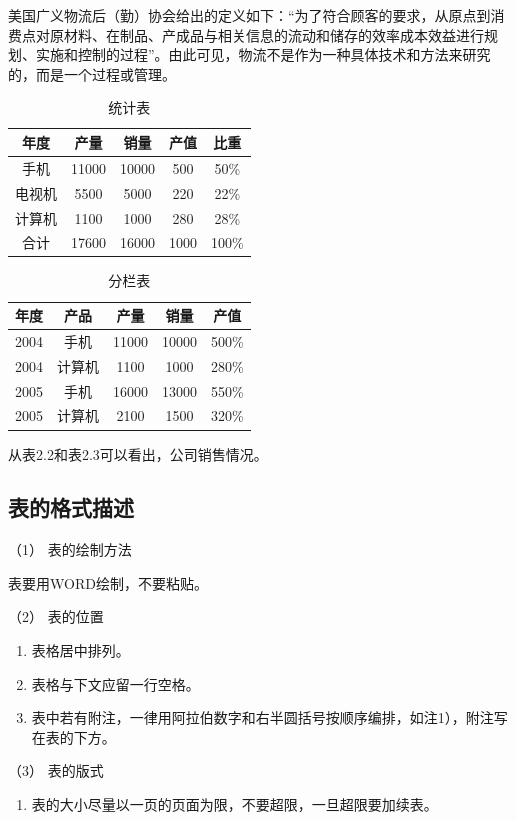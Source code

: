 美国广义物流后（勤）协会给出的定义如下：“为了符合顾客的要求，从原点到消费点对原材料、在制品、产成品与相关信息的流动和储存的效率成本效益进行规划、实施和控制的过程”。由此可见，物流不是作为一种具体技术和方法来研究的，而是一个过程或管理。

\begin{table}
	\centering
	\song\wuhao
	\caption{ 统计表}
	\begin{tabular}{ccccc}
	\hline
	年度&产量&销量&产值&比重\\
	\hline
	手机&11000&10000&500&50\%\\
	电视机&5500&5000&220&22\%\\
	计算机&1100&1000&280&28\%\\
	\hline
	合计&17600&16000&1000&100\%\\
	\hline
	\end{tabular}
\end{table}

\begin{table}
	\centering
	\song\wuhao
	\caption{ 分栏表}
	\begin{tabular}{ccccc}
	\hline
	年度&产品&产量&销量&产值\\
	\hline
	2004&手机&11000&10000&500\%\\
	2004&计算机&1100&1000&280\%\\
	\hline
	2005&手机&16000&13000&550\%\\
	2005&计算机&2100&1500&320\%\\
	\hline
	\end{tabular}
\end{table}

从表2.2和表2.3可以看出，公司销售情况。

\subsection{表的格式描述}
（1） 表的绘制方法

表要用WORD绘制，不要粘贴。

（2） 表的位置
\begin{enumerate}[label=\circled{\arabic*}]
\item 表格居中排列。
\item 表格与下文应留一行空格。
\item 表中若有附注，一律用阿拉伯数字和右半圆括号按顺序编排，如注1），附注写在表的下方。
\end{enumerate}

（3） 表的版式
\begin{enumerate}[label=\circled{\arabic*}]
\item 表的大小尽量以一页的页面为限，不要超限，一旦超限要加续表。
\end{enumerate}

